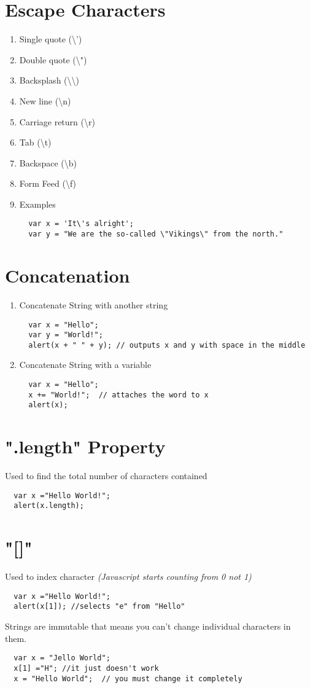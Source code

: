 \documentclass{article}
\begin{document}
\section{Escape Characters}
\begin{enumerate}
\item Single quote (\textbackslash')
\item Double quote (\textbackslash")
\item Backsplash (\textbackslash\textbackslash)
\item New line (\textbackslash n)
\item Carriage return (\textbackslash r)
\item Tab (\textbackslash t)
\item Backspace (\textbackslash b)
\item Form Feed (\textbackslash f)
\item Examples
\begin{lstlisting}
  var x = 'It\'s alright';
  var y = "We are the so-called \"Vikings\" from the north."
\end{lstlisting}
\end{enumerate}
\section{Concatenation}
\begin{enumerate}
\item Concatenate String with another string
\begin{lstlisting}
  var x = "Hello";
  var y = "World!";
  alert(x + " " + y); // outputs x and y with space in the middle
\end{lstlisting}
\item Concatenate String with a variable
\begin{lstlisting}
  var x = "Hello";
  x += "World!";  // attaches the word to x
  alert(x);
\end{lstlisting}
\end{enumerate}
\section{".length" Property}
Used to find the total number of characters contained
\begin{lstlisting}
  var x ="Hello World!";
  alert(x.length);
\end{lstlisting}
\section{"[]"}
Used to index character \emph{(Javascript starts counting from 0 not 1)}
\begin{lstlisting}
  var x ="Hello World!";
  alert(x[1]); //selects "e" from "Hello"
\end{lstlisting}
Strings are immutable that means you can't change individual characters in them.
\begin{lstlisting}
  var x = "Jello World";
  x[1] ="H"; //it just doesn't work
  x = "Hello World";  // you must change it completely
\end{lstlisting}
\end{document}
